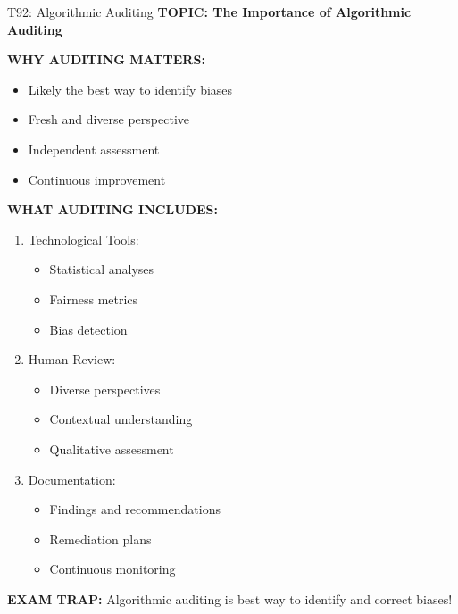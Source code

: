 \documentclass[8pt]{beamer}
\begin{document}
	\begin{frame}{T92: Algorithmic Auditing}
		\fontsize{6.5}{7.5}\selectfont
		\textbf{TOPIC: The Importance of Algorithmic Auditing}
		
		\vspace{0.1cm}
		\textbf{WHY AUDITING MATTERS:}
		\begin{itemize}
			\item Likely the best way to identify biases
			\item Fresh and diverse perspective
			\item Independent assessment
			\item Continuous improvement
		\end{itemize}
		
		\vspace{0.1cm}
		\textbf{WHAT AUDITING INCLUDES:}
		\begin{enumerate}
			\item \textcolor{myblue}{Technological Tools:}
			\begin{itemize}
				\item Statistical analyses
				\item Fairness metrics
				\item Bias detection
			\end{itemize}
			\item \textcolor{myblue}{Human Review:}
			\begin{itemize}
				\item Diverse perspectives
				\item Contextual understanding
				\item Qualitative assessment
			\end{itemize}
			\item \textcolor{myblue}{Documentation:}
			\begin{itemize}
				\item Findings and recommendations
				\item Remediation plans
				\item Continuous monitoring
			\end{itemize}
		\end{enumerate}
		
		\textcolor{myred}{\textbf{EXAM TRAP:}} Algorithmic auditing is \textcolor{myblue}{best way to identify and correct biases}!
	\end{frame}
	
\end{document}
